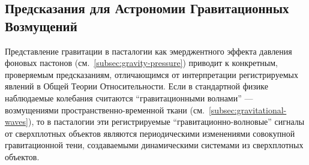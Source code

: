 \documentclass[pdflatex,sn-mathphys-num]{sn-jnl}
\begin{document}
\subsection{Предсказания для Астрономии Гравитационных Возмущений}\label{subsec:gravitational-astronomy}

Представление гравитации в пасталогии как эмерджентного эффекта давления фоновых пастонов (см.~\ref{subsec:gravity-pressure}) приводит к конкретным, проверяемым предсказаниям, отличающимся от интерпретации регистрируемых явлений в Общей Теории Относительности. Если в стандартной физике наблюдаемые колебания считаются ``гравитационными волнами'' --- возмущениями пространственно-временной ткани (см.~\ref{subsec:gravitational-waves}), то в пасталогии эти регистрируемые ``гравитационно-волновые'' сигналы от сверхплотных объектов являются периодическими изменениями совокупной гравитационной тени, создаваемыми динамическими системами из сверхплотных объектов.
\end{document}
